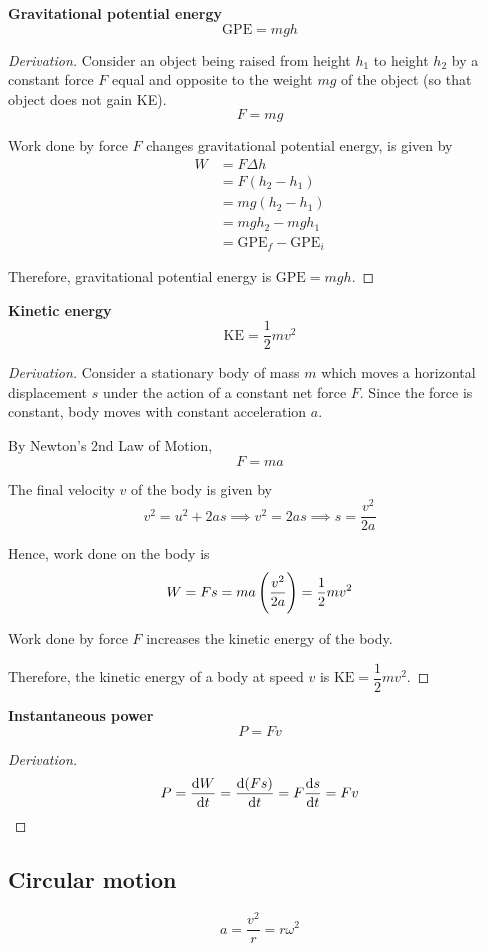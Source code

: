 \textbf{Gravitational potential energy}
\[ \mathrm{GPE} = mgh \]

\begin{proof}[Derivation]
Consider an object being raised from height $h_1$ to height $h_2$ by a constant force $F$ equal and opposite to the weight $mg$ of the object (so that object does not gain KE).
\[ F=mg \]

Work done by force $F$ changes gravitational potential energy, is given by
\begin{align*}
    W &= F \Delta h \\
    &= F (h_2 - h_1) \\
    &= mg (h_2 - h_1) \\
    &= mgh_2 - mgh_1 \\
    &= \mathrm{GPE}_f - \mathrm{GPE}_i
\end{align*}

Therefore, gravitational potential energy is $\mathrm{GPE} = mgh$.
\end{proof}

\textbf{Kinetic energy}
\[ \mathrm{KE} = \frac{1}{2}mv^2 \]

\begin{proof}[Derivation]
Consider a stationary body of mass $m$ which moves a horizontal displacement $s$ under the action of a constant net force $F$. Since the force is constant, body moves with constant acceleration $a$. 

By Newton's 2nd Law of Motion,
\[ F = ma \]

The final velocity $v$ of the body is given by 
\[ v^2 = u^2 + 2as \implies v^2 = 2as \implies s = \frac{v^2}{2a} \]

Hence, work done on the body is 
\[ W = Fs = ma \left(\frac{v^2}{2a}\right) = \frac{1}{2}mv^2 \]

Work done by force $F$ increases the kinetic energy of the body. 

Therefore, the kinetic energy of a body at speed $v$ is $\mathrm{KE} = \dfrac{1}{2}mv^2$.
\end{proof}

\textbf{Instantaneous power}
\[ P = Fv \]

\begin{proof}[Derivation]
\[ P = \dv{W}{t} = \dv{(Fs)}{t} = F\dv{s}{t} = Fv \]
\end{proof}
\pagebreak

\subsection{Circular motion}
\begin{equation} a = \frac{v^2}{r} = r\omega^2 \end{equation}

